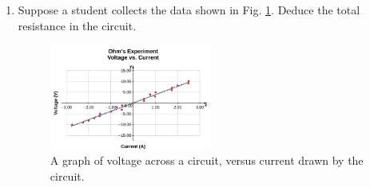 \documentclass{article}
\begin{document}
\begin{enumerate}
\item Suppose a student collects the data shown in Fig. \ref{fig:ohm1}.  Deduce the total resistance in the circuit.
\begin{figure}[ht]
\centering
\includegraphics[width=0.5\textwidth]{ohm1.png}
\caption{\label{fig:ohm1} A graph of voltage across a circuit, versus current drawn by the circuit.}
\end{figure}
\end{enumerate}
\end{document}
